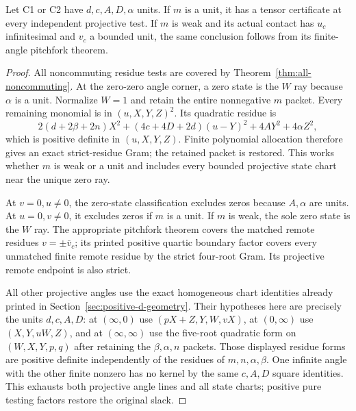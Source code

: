 \begin{lemma}
\label{lem:positive-d-strong-dispatch}
Let C1 or C2 have $d,c,A,D,\alpha$ units. If $m$ is a unit, it has
a tensor certificate at every independent projective test. If $m$
is weak and its actual contact has $u_c$ infinitesimal and $v_c$
a bounded unit, the same conclusion follows from its finite-angle
pitchfork theorem.
\end{lemma}
\begin{proof}
All noncommuting residue tests are covered by
Theorem~\ref{thm:all-noncommuting}. At the zero-zero angle corner,
a zero state is the $W$ ray because $\alpha$ is a unit. Normalize
$W=1$ and retain the entire nonnegative $m$ packet. Every remaining
monomial is in $(u,X,Y,Z)^2$. Its quadratic residue is
\[
 2(d+2\beta+2n)X^2+(4c+4D+2d)(u-Y)^2+4AY^2+4\alpha Z^2,
\]
which is positive definite in $(u,X,Y,Z)$. Finite polynomial
allocation therefore gives an exact strict-residue Gram; the
retained packet is restored. This works whether $m$ is weak or a
unit and includes every bounded projective state chart near the
unique zero ray.

At $v=0,u\ne0$, the zero-state classification excludes zeros because
$A,\alpha$ are units. At $u=0,v\ne0$, it excludes zeros if $m$ is
a unit. If $m$ is weak, the sole zero state is the $W$ ray. The
appropriate pitchfork theorem covers the matched remote residues
$v=\pm\bar v_c$; its printed positive quartic boundary factor
covers every unmatched finite remote residue by the strict
four-root Gram. Its projective remote endpoint is also strict.

All other projective angles use the exact homogeneous chart
identities already printed in Section~\ref{sec:positive-d-geometry}.
Their hypotheses here are precisely the units $d,c,A,D$: at
$(\infty,0)$ use $(pX+Z,Y,W,vX)$, at $(0,\infty)$ use
$(X,Y,uW,Z)$, and at $(\infty,\infty)$ use the five-root
quadratic form on $(W,X,Y,p,q)$ after retaining the $\beta,\alpha,n$
packets.
Those displayed residue forms are positive definite independently
of the residues of $m,n,\alpha,\beta$. One infinite angle with the
other finite nonzero has no kernel by the same $c,A,D$ square
identities. This exhausts both projective angle lines and all state
charts; positive pure testing factors restore the original slack.
\end{proof}

